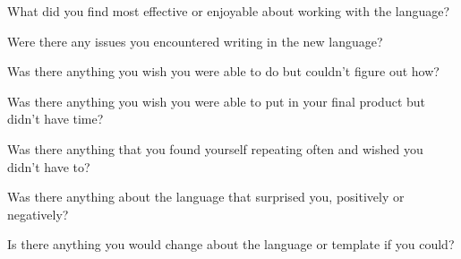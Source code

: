 What did you find most effective or enjoyable about working with the language?

Were there any issues you encountered writing in the new language?

Was there anything you wish you were able to do but couldn’t figure out how?

Was there anything you wish you were able to put in your final product but didn’t have time?

Was there anything that you found yourself repeating often and wished you didn’t have to?

Was there anything about the language that surprised you, positively or negatively?

Is there anything you would change about the language or template if you could?
